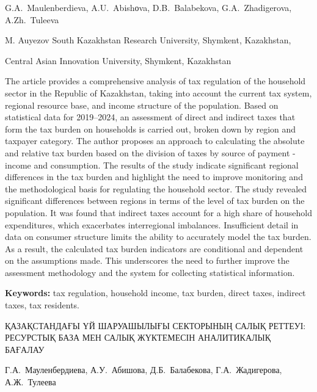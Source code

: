 
\begin{header}

G.A.~Maulenberdieva\envelope,
A.U.~Abishоva,
D.B.~Balabekova,
G.A.~Zhadigerova,
A.Zh.~Tuleeva
\end{header}

\begin{affil}
M. Auyezov South Kazakhstan Research University, Shymkent, Kazakhstan,

Central Asian Innovation University, Shymkent, Kazakhstan

\end{affil}

The article provides a comprehensive analysis of tax regulation of the
household sector in the Republic of Kazakhstan, taking into account the
current tax system, regional resource base, and income structure of the
population. Based on statistical data for 2019--2024, an assessment of
direct and indirect taxes that form the tax burden on households is
carried out, broken down by region and taxpayer category. The author
proposes an approach to calculating the absolute and relative tax burden
based on the division of taxes by source of payment - income and
consumption. The results of the study indicate significant regional
differences in the tax burden and highlight the need to improve
monitoring and the methodological basis for regulating the household
sector. The study revealed significant differences between regions in
terms of the level of tax burden on the population. It was found that
indirect taxes account for a high share of household expenditures, which
exacerbates interregional imbalances. Insufficient detail in data on
consumer structure limits the ability to accurately model the tax
burden. As a result, the calculated tax burden indicators are
conditional and dependent on the assumptions made. This underscores the
need to further improve the assessment methodology and the system for
collecting statistical information.

{\bfseries Keywords:} tax regulation, household income, tax burden, direct
taxes, indirect taxes, tax residents.

\begin{header}
ҚАЗАҚСТАНДАҒЫ ҮЙ ШАРУАШЫЛЫҒЫ СЕКТОРЫНЫҢ САЛЫҚ РЕТТЕУІ: РЕСУРСТЫҚ БАЗА МЕН САЛЫҚ ЖҮКТЕМЕСІН АНАЛИТИКАЛЫҚ БАҒАЛАУ

Г.А.~Мауленбердиева\envelope,
А.У.~Абишова,
Д.Б.~Балабекова,
Г.А.~Жадигерова,
А.Ж.~Тулеева
\end{header}

